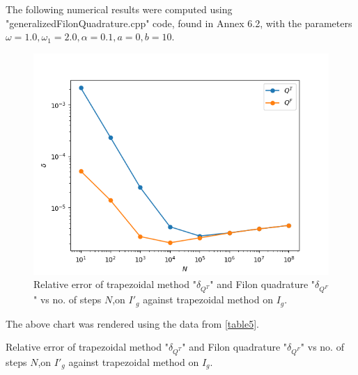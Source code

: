 The following numerical results were computed using "generalizedFilonQuadrature.cpp" code, found in Annex 6.2, with the parameters 
$\omega=1.0, \omega_1=2.0, \alpha=0.1, a=0, b=10$.

\begin{figure}[H]
  \centering
  \includegraphics[scale=0.8]{c4/results.png}
  \caption{Relative error of trapezoidal method "$\delta_{Q^T}$" and Filon quadrature "$\delta_{Q^F}$" vs no. of steps $N$,on $I'_g$ against trapezoidal method on $I_g$.}
  \label{figGraphGen}
\end{figure}

The above chart was rendered using the data from \ref{table5}.

\begin{table}[h!]
  \begin{center}
    \caption{Relative error of trapezoidal method "$\delta_{Q^T}$" and Filon quadrature "$\delta_{Q^F}$" vs no. of steps $N$,on $I'_g$ against trapezoidal method on $I_g$.}
    \label{table5}
  \end{center}
\end{table}


